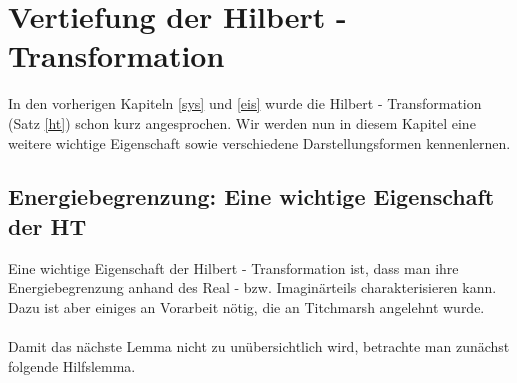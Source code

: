 \chapter{Vertiefung der Hilbert - Transformation}\label{kkt:c}
In den vorherigen Kapiteln \ref{sys} und \ref{eis}  wurde die Hilbert - Transformation (Satz \ref{ht}) schon kurz angesprochen. Wir werden nun in diesem Kapitel eine weitere wichtige Eigenschaft sowie verschiedene Darstellungsformen kennenlernen.   
\section{Energiebegrenzung: Eine wichtige Eigenschaft der HT} 
\label{ht:Anmerkung}Eine wichtige Eigenschaft der Hilbert - Transformation ist, dass man ihre Energiebegrenzung anhand des Real - bzw. Imaginärteils charakterisieren kann. Dazu ist aber einiges an Vorarbeit nötig, die an Titchmarsh \cite{titch1948} angelehnt wurde. \\\\
Damit das nächste Lemma nicht zu unübersichtlich wird, betrachte man zunächst folgende Hilfslemma. 
